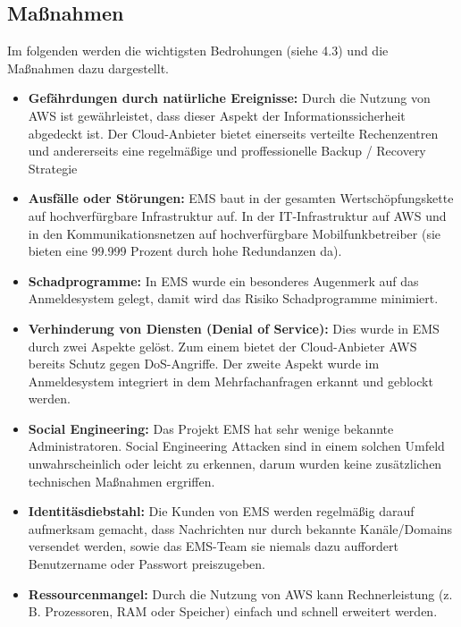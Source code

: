 \subsection{Maßnahmen}
Im folgenden werden die wichtigsten Bedrohungen (siehe 4.3) und die Maßnahmen dazu dargestellt.
\begin{itemize}
	\item \textbf{Gefährdungen durch natürliche Ereignisse:} Durch die Nutzung von AWS ist gewährleistet, dass dieser Aspekt der Informationssicherheit abgedeckt ist. Der Cloud-Anbieter bietet einerseits verteilte Rechenzentren und andererseits eine regelmäßige und proffessionelle Backup / Recovery Strategie
	\item \textbf{Ausfälle oder Störungen:} EMS baut in der gesamten Wertschöpfungskette auf hochverfürgbare Infrastruktur auf. In der IT-Infrastruktur auf AWS und in den Kommunikationsnetzen auf hochverfürgbare Mobilfunkbetreiber (sie bieten eine 99.999 Prozent durch hohe Redundanzen da).
	\item \textbf{Schadprogramme:} In EMS wurde ein besonderes Augenmerk auf das Anmeldesystem gelegt, damit wird das Risiko Schadprogramme minimiert.
	\item \textbf{Verhinderung von Diensten (Denial of Service):} Dies wurde in EMS durch zwei Aspekte gelöst. Zum einem bietet der Cloud-Anbieter AWS bereits Schutz gegen DoS-Angriffe. Der zweite Aspekt wurde im Anmeldesystem integriert in dem Mehrfachanfragen erkannt und geblockt werden.
	\item \textbf{Social Engineering:} Das Projekt EMS hat sehr wenige bekannte Administratoren. Social Engineering Attacken sind in einem solchen Umfeld unwahrscheinlich oder leicht zu erkennen, darum wurden keine zusätzlichen technischen Maßnahmen ergriffen.
	\item \textbf{Identitäsdiebstahl:} Die Kunden von EMS werden regelmäßig darauf aufmerksam gemacht, dass Nachrichten nur durch bekannte Kanäle/Domains versendet werden, sowie das EMS-Team sie niemals dazu auffordert Benutzername oder Passwort preiszugeben.
	\item \textbf{Ressourcenmangel:} Durch die Nutzung von AWS kann Rechnerleistung (z. B. Prozessoren, RAM oder Speicher) einfach und schnell erweitert werden.
\end{itemize}


\newpage